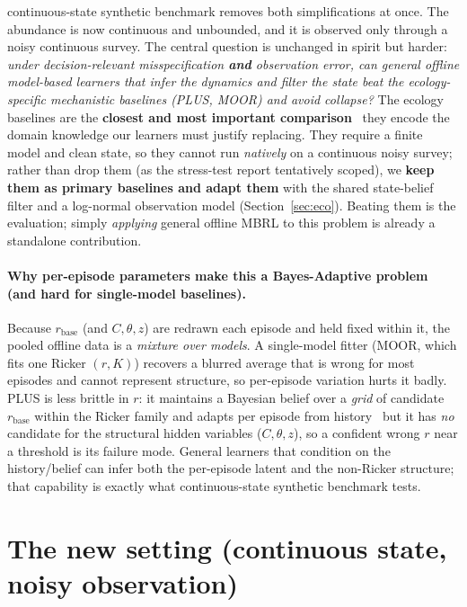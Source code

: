 \documentclass[11pt]{article}
\newcommand{\rbase}{r_{\mathrm{base}}}
\begin{document}
continuous-state synthetic benchmark removes both simplifications at once. The abundance is now continuous and
unbounded, and it is observed only through a noisy continuous survey. The central
question is unchanged in spirit but harder: \emph{under decision-relevant
misspecification \textbf{and} observation error, can general offline model-based
learners that infer the dynamics and filter the state beat the ecology-specific
mechanistic baselines (PLUS, MOOR) and avoid collapse?} The ecology baselines are
the \textbf{closest and most important comparison} \textemdash\ they encode the
domain knowledge our learners must justify replacing. They require a finite model
and clean state, so they cannot run \emph{natively} on a continuous noisy survey;
rather than drop them (as the stress-test report tentatively scoped), we
\textbf{keep them as primary baselines and adapt them} with the shared state-belief
filter and a log-normal observation model (Section~\ref{sec:eco}). Beating them is
the evaluation; simply \emph{applying} general offline MBRL to this problem is
already a standalone contribution.

\paragraph{Why per-episode parameters make this a Bayes-Adaptive problem (and hard
for single-model baselines).} Because $\rbase$ (and $C,\theta,z$) are redrawn each
episode and held fixed within it, the pooled offline data is a \emph{mixture over
models}. A single-model fitter (MOOR, which fits one Ricker $(r,K)$) recovers a
blurred average that is wrong for most episodes and cannot represent structure, so
per-episode variation hurts it badly. PLUS is less brittle in $r$: it maintains a
Bayesian belief over a \emph{grid} of candidate $\rbase$ within the Ricker family
and adapts per episode from history \textemdash\ but it has \emph{no} candidate for
the structural hidden variables ($C,\theta,z$), so a confident wrong $r$ near a
threshold is its failure mode. General learners that condition on the
history/belief can infer both the per-episode latent and the non-Ricker structure;
that capability is exactly what continuous-state synthetic benchmark tests.

\section{The new setting (continuous state, noisy observation)}
\label{sec:setting}
\end{document}
